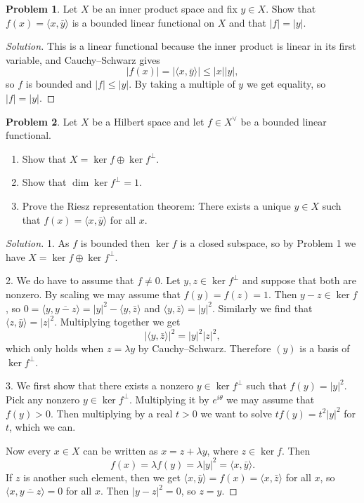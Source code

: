 \documentclass[11pt]{article}
\theoremstyle{definition}
\newtheorem{prob}{Problem}
\def\<{\langle}
\def\>{\rangle}
\begin{document}
\begin{prob}
Let $X$ be an inner product space and fix $y \in X$.
Show that $f(x) = \<x, \bar y \>$ is a bounded linear functional on $X$
and that $|f| = |y|$.
\end{prob}

\begin{proof}[Solution]
This is a linear functional because the inner product is linear in its
first variable, and Cauchy--Schwarz gives
\[
|f(x)| = |\<x, \bar y\>| \leq |x| |y|,
\]
so $f$ is bounded and $|f| \leq |y|$.
By taking a multiple of $y$ we get equality, so $|f| = |y|$.
\end{proof}

\begin{prob}
Let $X$ be a Hilbert space and let $f \in X^\vee$ be a bounded linear
functional.
\begin{enumerate}
\item
Show that $X = \ker f \oplus \ker f^\perp$.

\item
Show that $\dim \ker f^\perp = 1$.

\item
Prove the Riesz representation theorem:
There exists a unique $y \in X$ such that $f(x) = \< x, \bar y \>$ for all $x$.
\end{enumerate}
\end{prob}

\begin{proof}[Solution]
1. As $f$ is bounded then $\ker f$ is a closed subspace, so by Problem 1 we have
$X = \ker f \oplus \ker f^\perp$.

2. We do have to assume that $f \not= 0$.
Let $y,z \in \ker f^\perp$ and suppose that both are nonzero.
By scaling we may assume that $f(y) = f(z) = 1$.
Then $y - z \in \ker f$, so
$0 = \<y, \overline{y - z}\> = |y|^2 - \<y, \bar z\>$
and $\<y, \bar z\> = |y|^2$.
Similarly we find that $\<z, \bar y\> = |z|^2$.
Multiplying together we get
\[
|\<y, \bar z\>|^2 = |y|^2 |z|^2,
\]
which only holds when $z = \lambda y$ by Cauchy--Schwarz.
Therefore $(y)$ is a basis of $\ker f^\perp$.

3.
We first show that there exists a nonzero $y \in \ker f^\perp$ such that
$f(y) = |y|^2$.
Pick any nonzero $y \in \ker f^\perp$.
Multiplying it by $e^{i\theta}$ we may assume that $f(y) > 0$.
Then multiplying by a real $t > 0$ we want to solve $t f(y) = t^2 |y|^2$
for $t$, which we can.

Now every $x \in X$ can be written as $x = z + \lambda y$, where $z \in \ker f$.
Then
\[
f(x) = \lambda f(y) = \lambda |y|^2 = \<x, \bar y\>.
\]
If $z$ is another such element, then we get $\<x, \bar y\> = f(x) = \<x, \bar
z\>$ for all $x$, so $\<x, \overline{y - z}\> = 0$ for all $x$.
Then $|y - z|^2 = 0$, so $z = y$.
\end{proof}
\end{document}
